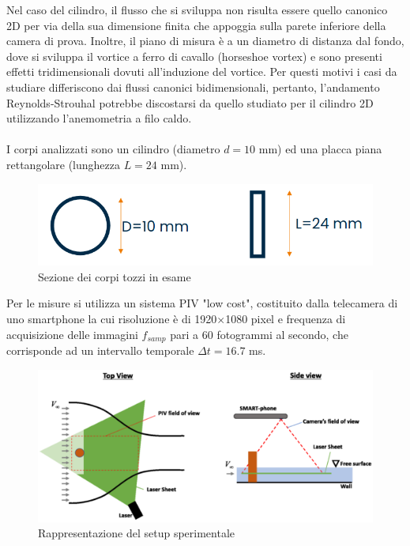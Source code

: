 \noindent Nel caso del cilindro, il flusso che si sviluppa non risulta essere quello canonico 2D per via della sua dimensione finita che appoggia sulla parete inferiore della camera di prova. Inoltre, il piano di misura è a un diametro di distanza dal fondo, dove si sviluppa il vortice a ferro di cavallo (horseshoe vortex) e sono presenti effetti tridimensionali dovuti all'induzione del vortice. Per questi motivi i casi da studiare differiscono dai flussi canonici bidimensionali, pertanto, l'andamento Reynolds-Strouhal potrebbe discostarsi da quello studiato per il cilindro 2D utilizzando l'anemometria a filo caldo.\\\\
I corpi analizzati sono un cilindro (diametro $d=10$ mm) ed una placca piana rettangolare (lunghezza $L=24$ mm).
\begin{figure}[H]
    \centering
    \includegraphics[width=.5\textwidth]{images/11/rapprcorpi.png}
    \caption{Sezione dei corpi tozzi in esame}
\end{figure}

\noindent Per le misure si utilizza un sistema PIV "low cost", costituito dalla telecamera di uno smartphone la cui risoluzione è di 1920$\times$1080 pixel e frequenza di acquisizione delle immagini $f_{samp}$ pari a 60 fotogrammi al secondo, che corrisponde ad un intervallo temporale $\Delta t = 16.7$ ms.
\begin{figure}[H]
    \centering
    \includegraphics[width=.8\textwidth]{images/11/rapprcatena.png}
    \caption{Rappresentazione del setup sperimentale}
\end{figure}

